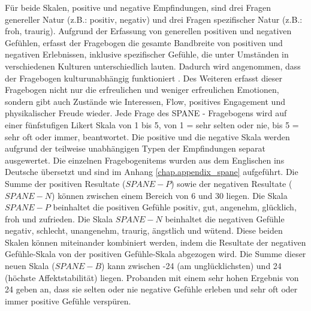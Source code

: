 Für beide Skalen, positive und negative Empfindungen, sind drei Fragen genereller Natur (z.B.: positiv, negativ) und drei Fragen spezifischer Natur (z.B.: froh, traurig). Aufgrund der Erfassung von generellen positiven und negativen Gefühlen, erfasst der Fragebogen die gesamte Bandbreite von positiven und negativen Erlebnissen, inklusive spezifischer Gefühle, die unter Umständen in verschiedenen Kulturen unterschiedlich lauten. Dadurch wird angenommen, dass der Fragebogen kulturunabhängig funktioniert \cite{Silva2013}. Des Weiteren erfasst dieser Fragebogen nicht nur die erfreulichen und weniger erfreulichen Emotionen, sondern gibt auch Zustände wie Interessen, Flow, positives Engagement und physikalischer Freude wieder.
Jede Frage des SPANE - Fragebogens wird auf einer fünfstufigen Likert Skala von 1 bis 5, von 1 = sehr selten oder nie, bis 5 = sehr oft oder immer, beantwortet. Die positive und die negative Skala werden aufgrund der teilweise unabhängigen Typen der Empfindungen separat ausgewertet. Die einzelnen Fragebogenitems wurden aus dem Englischen ins Deutsche übersetzt und sind im Anhang \ref{chap.appendix_spane} aufgeführt. Die Summe der positiven Resultate ($SPANE-P$) sowie der negativen Resultate ($SPANE-N$) können zwischen einem Bereich von 6 und 30 liegen. Die Skala $SPANE-P$ beinhaltet die positiven Gefühle positiv, gut, angenehm, glücklich, froh und zufrieden. Die Skala $SPANE-N$ beinhaltet die negativen Gefühle negativ, schlecht, unangenehm, traurig, ängstlich und wütend. Diese beiden Skalen können miteinander kombiniert werden, indem die Resultate der negativen Gefühle-Skala von der positiven Gefühle-Skala abgezogen wird. Die Summe dieser neuen Skala ($SPANE-B$) kann zwischen -24 (am unglücklichsten) und 24 (höchste Affektstabilität) liegen. Probanden mit einem sehr hohen Ergebnis von 24 geben an, dass sie selten oder nie negative Gefühle erleben und sehr oft oder immer positive Gefühle verspüren.


